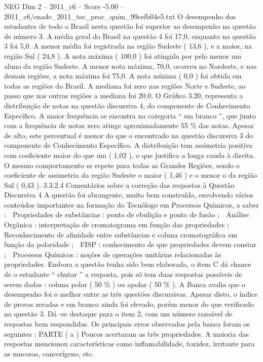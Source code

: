 \begin{textsample}{NEG Dim 2 – 2011\_c6 – Score -5.00 – 2011\_c6/enade\_2011\_tec\_proc\_quim\_99cefb04e5.txt}
O desempenho dos estudantes de todo o Brasil nesta questão foi superior ao desempenho na questão de número 3.
A média geral do Brasil na questão 4 foi 17,0, enquanto na questão 3 foi 5,0.
A menor média foi registrada na região Sudeste ( 13,6 ), e a maior, na região Sul ( 24,8 ).
A nota máxima ( 100,0 ) foi atingida por pelo menos um aluno da região Sudeste.
A menor nota máxima, 70,0, ocorreu no Nordeste, e nas demais regiões, a nota máxima foi 75,0.
A nota mínima ( 0,0 ) foi obtida em todas as regiões do Brasil.
A mediana foi zero nas regiões Norte e Sudeste, ao passo que nas outras regiões a mediana foi 20,0.
O Gráfico 3.20, representa a distribuição de notas na questão discursiva 4, do componente de Conhecimento Específico.
A maior frequência se encontra na categoria “ em branco ”, que junto com a frequência de notas zero atinge aproximadamente 55 \% das notas.
Apesar de alto, este percentual é menor do que o encontrado na questão discursiva 3 do componente de Conhecimento Específico.
A distribuição tem assimetria positiva com coeficiente maior do que um ( 1,02 ), o que justifica a longa cauda à direita.
O mesmo comportamento se repete para todas as Grandes Regiões, sendo o coeficiente de assimetria da região Sudeste o maior ( 1,46 ) e o menor o da região Sul ( 0,43 ). 3.3.2.4 Comentários sobre a correção das respostas à Questão Discursiva 4 A questão foi abrangente, muito bem construída, envolvendo vários conteúdos importantes na formação do Tecnólogo em Processos Químicos, a saber :  Propriedades de substâncias : ponto de ebulição e ponto de fusão ;  Análise Orgânica : interpretação de cromatograma em função das propriedades ;  Reconhecimento de afinidade entre substâncias e coluna cromatográfica em função da polaridade ;  FISP : conhecimento de que propriedades devem constar ;  Processos Químicos : noções de operações unitárias relacionadas às propriedades.
Embora a questão tenha sido bem elaborada, o item C dá chance de o estudante “ chutar ” a resposta, pois só tem duas respostas possíveis de serem dadas : coluna polar ( 50 \% ) ou apolar ( 50 \% ).
A Banca avalia que o desempenho foi o melhor entre as três questões discursivas.
Apesar disto, o índice de provas zeradas e em branco ainda foi elevado, porém menor do que verificado na questão 3.
Dá -se destaque para o item 2, com um número razoável de respostas bem respondidas.
Os principais erros observados pela banca foram os seguintes : PARTE ( a ) Poucos acertaram as três propriedades.
A maioria das respostas mencionou características como inflamabilidade, toxidez, irritante para as mucosas, cancerígeno, etc.

\end{textsample}
